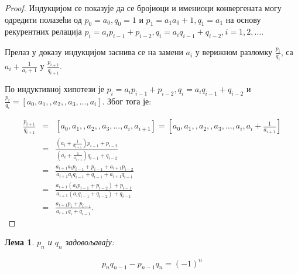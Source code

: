 \documentclass[a4paper]{article}
\newtheorem{lemma}{Лема}
\begin{document}
\begin{proof}
	
	Индукцијом се показује да се бројиоци и имениоци конвергената могу одредити полазећи од $ p_{0} = a_{0}, q_{0} = 1 $ и $ p_{1} = a_{1}a_{0} + 1, q_{1} = a_{1} $ на основу рекурентних релација $ p_{i} = a_{i}p_{i-1} + p_{i-2},  q_{i} = a_{i}q_{i-1} + q_{i-2}, i = 1, 2, \dots $.
	
	Прелаз у доказу индукцијом заснива се на замени $ a_{i} $ у верижном разломку $ \frac{p_{i}}{q_{i}} $, са $ a_{i} + \frac{1}{a_{i} + 1} $
	у $ \frac{p_{i+1}}{q_{i+1}} $.
	
	По индуктивној хипотези је $ p_{i} = a_{i}p_{i-1} + p_{i-2}, q_{i} = a_{i}q_{i-1} + q_{i-2} $ и $ \frac{p_{i}}{q_{i}} = [a_{0}, a_{1}, , a_{2}, , a_{3}, \dots, a_{i}] $. Због тога је:
	
	\begin{eqnarray*}
		\frac{p_{i+1}}{q_{i+1}} &=& [a_{0}, a_{1}, , a_{2}, , a_{3}, \dots, a_{i}, a_{i+1}] = [a_{0}, a_{1}, , a_{2}, , a_{3}, \dots, a_{i}, a_{i} + \frac{1}{a_{i+1}}] \\
		&=& \frac{(a_{i} + \frac{1}{a_{i+1}})p_{i-1} + p_{i-2}}{(a_{i} + \frac{1}{a_{i+1}})q_{i-1} + q_{i-2}} \\
		&=& \frac{a_{i+1}a_{i}p_{i-1} + p_{i-1} + a_{i+1}p_{i-2}}{a_{i+1}a_{i}q_{i-1} + q_{i-1} + a_{i+1}q_{i-1}}\\
		&=& \frac{a_{i+1}(a_{i}p_{i-1} + p_{i-2}) + p_{i-1}}{a_{i+1}(a_{i}q_{i-1} + q_{i-2}) + q_{i-1}}\\
		&=& \frac{a_{i+1}p_{i} + p_{i-1}}{a_{i+1}q_{i} + q_{i-1}}. 
	\end{eqnarray*}

\end{proof}

\begin{lemma}
	$ p_{n} $ и $ q_{n} $ задовољавају:
	
	\begin{eqnarray}
		\label{c.f_svojstvo_1} p_{n}q_{n-1} - p_{n-1}q_{n} = (-1)^{n}
	\end{eqnarray}	
\end{lemma}
\end{document}
